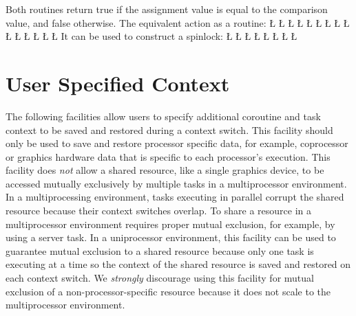 \documentclass[openright,twoside]{report}
\begin{document}
\begin{itemize}
Both routines return true if the assignment value is equal to the comparison value, and false otherwise.
The equivalent action as a \Index[C++]{\CC} routine:
\LGinlinefalse\LGbegin\lgrinde
\L{}
\CE{}\L{}
\CE{}\L{\LB{}}
\CE{}\L{\LB{}}
\L{\LB{}}
\L{\LB{}}
\L{\LB{\}}}
\endlgrinde\LGend
\LGinlinefalse\LGbegin\lgrinde
\L{}
\CE{}\L{\LB{}}
\CE{}\L{\LB{}}
\CE{}\L{\LB{}}
\L{\LB{}}
\L{\LB{}}
\CE{}\L{\LB{}}
\L{\LB{\}}}
\endlgrinde\LGend
It can be used to construct a spinlock:
\LGinlinefalse\LGbegin\lgrinde
\L{}
\CE{}\L{}
\CE{}\L{\LB{}}
\L{}
\CE{}\L{\LB{}}
\L{\LB{}}
\CE{}\L{\LB{}}
\L{\LB{\}}}
\endlgrinde\LGend
\end{itemize}


\section{User Specified Context}

The following facilities allow users to specify additional coroutine and task context to be saved and restored during a context switch.
This facility should only be used to save and restore processor specific data, for example, coprocessor or graphics hardware data that is specific to each processor's execution.
This facility does \emph{not} allow a shared resource, like a single graphics device, to be accessed mutually exclusively by multiple tasks in a multiprocessor environment.
In a multiprocessing environment, tasks executing in parallel corrupt the shared resource because their context switches overlap.
To share a resource in a multiprocessor environment requires proper mutual exclusion, for example, by using a server task.
In a uniprocessor environment, this facility can be used to guarantee mutual exclusion to a shared resource because only one task is executing at a time so the context of the shared resource is saved and restored on each context switch.
We \emph{strongly} discourage using this facility for mutual exclusion of a non-processor-specific resource because it does not scale to the multiprocessor environment.
\end{document}
